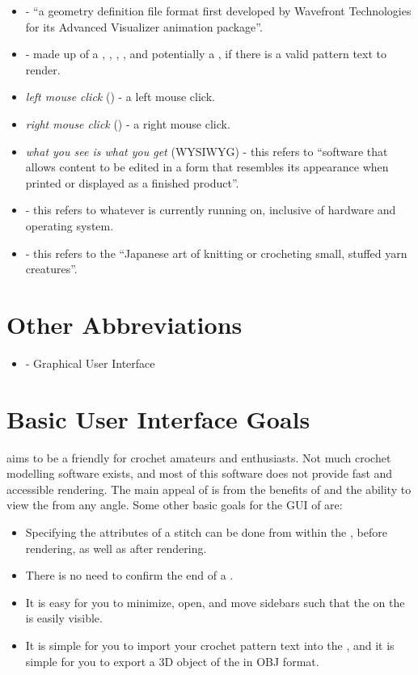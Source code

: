 \documentclass[main.tex]{subfiles}
\begin{document}
\begin{itemize}
\item {} - ``a geometry definition file format first developed by Wavefront Technologies for its Advanced Visualizer animation package''.
\item \ScLayout* - made up of a \MenuBar, \PatSidebar, \PropSidebar, \CRW, and potentially a \RM, if there is a valid pattern text to render.
\item \emph{left mouse click} () - a left mouse click. 
\item \emph{right mouse click} () - a right mouse click.
\item \emph{what you see is what you get} (WYSIWYG) - this refers to ``software that allows content to be edited in a form that resembles its appearance when printed or displayed as a finished product''.
\item {} - this refers to whatever \CC{} is currently running on, inclusive of hardware and operating system.
\item {} - this refers to the ``Japanese art of knitting or crocheting small, stuffed yarn creatures''.
\end{itemize}

\section{Other Abbreviations}

\begin{itemize}
\item {} - Graphical User Interface
\end{itemize}

\section{Basic User Interface Goals}

\CC{} aims to be a friendly  for crochet amateurs and enthusiasts. Not much crochet modelling software exists, and most of this software does not provide fast and accessible rendering. The main appeal of \CC{} is from the benefits of  and the ability to view the \RM{} from any angle. Some other basic goals for the GUI of \CC{} are:

\begin{itemize}
\item Specifying the attributes of a stitch can be done from within the \PTI, before rendering, as well as after rendering.
\item There is no need to confirm the end of a \PTI.
\item It is easy for you to minimize, open, and move sidebars such that the \RM{} on the \CRW{} is easily visible.
\item It is simple for you to import your crochet pattern text into the \PTI, and it is simple for you to export a 3D object of the \RM{} in OBJ format.
\end{itemize}
\end{document}
